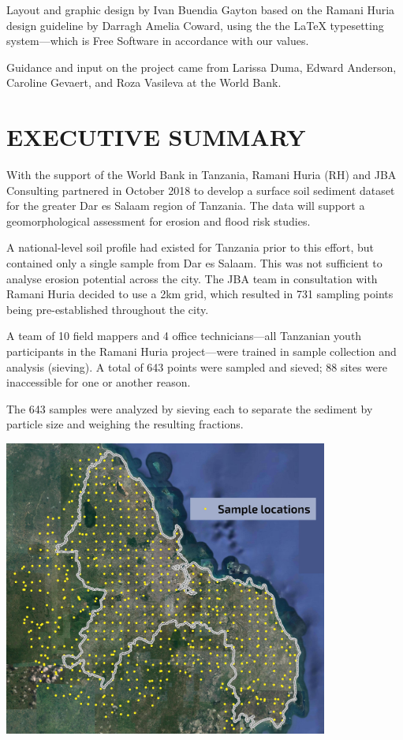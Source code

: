 \documentclass[a4paper,12pt,twoside]{article}
\begin{document}
Layout and graphic design by Ivan Buendia Gayton based on the Ramani Huria design guideline by Darragh Amelia Coward, using the the \LaTeX { } typesetting system---which is Free Software in accordance with our values.

\medskip

Guidance and input on the project came from Larissa Duma, Edward Anderson, Caroline Gevaert, and Roza Vasileva at the World Bank. 

\newpage

\tableofcontents


\newpage
\color{RHblue}
\section{EXECUTIVE SUMMARY}
\label{executivesummary}

\color{RHgrey}
\begin{multicols}{2}
With the support of the World Bank in Tanzania, Ramani Huria (RH) and JBA Consulting partnered in October 2018 to develop a surface soil sediment dataset for the greater Dar es Salaam region of Tanzania. The data will support a geomorphological assessment for erosion and flood risk studies. 

A national-level soil profile had existed for Tanzania prior to this effort, but contained only a single sample from Dar es Salaam. This was not sufficient to analyse erosion potential across the city. The JBA team in consultation with Ramani Huria decided to use a 2km grid, which resulted in 731 sampling points being pre-established throughout the city.

A team of 10 field mappers and 4 office technicians---all Tanzanian youth participants in the Ramani Huria project---were trained in sample collection and analysis (sieving). A total of 643 points were sampled and sieved; 88 sites were inaccessible for one or another reason.

The 643 samples were analyzed by sieving each to separate the sediment by particle size and weighing the resulting fractions.

\end{multicols}

\includegraphics[width=0.8\textwidth]{sample_locations.jpg}
\end{document}
